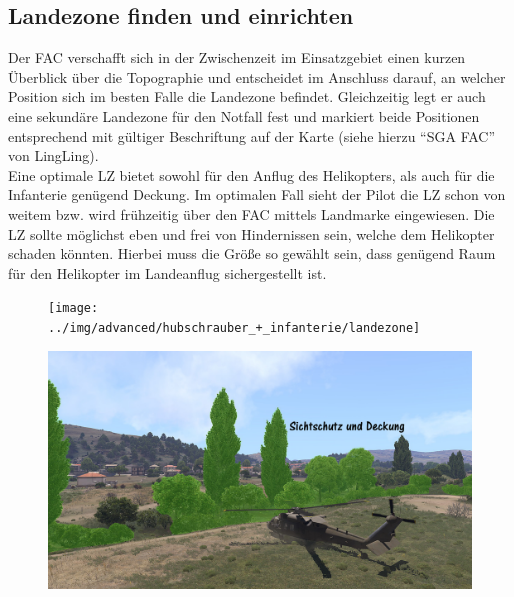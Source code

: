 \subsection{Landezone finden und einrichten}
Der FAC verschafft sich in der Zwischenzeit im Einsatzgebiet einen kurzen Überblick über 
die Topographie und entscheidet im Anschluss darauf, an welcher Position sich im besten 
Falle die Landezone befindet. Gleichzeitig legt er auch eine sekundäre Landezone für den 
Notfall fest und markiert beide Positionen entsprechend mit gültiger Beschriftung auf der  
Karte (siehe hierzu “SGA FAC” von LingLing).\\
Eine optimale LZ bietet sowohl für den Anflug des Helikopters, als auch für die Infanterie 
genügend Deckung. Im optimalen Fall sieht der Pilot die LZ schon von weitem bzw. wird  
frühzeitig über den FAC mittels Landmarke eingewiesen. Die LZ sollte möglichst eben und  
frei von Hindernissen sein, welche dem Helikopter schaden könnten. Hierbei muss die  
Größe so gewählt sein, dass genügend Raum für den Helikopter im Landeanflug  
sichergestellt ist. 
	\begin{figure}[htbp]
		\centering
		\texttt{[image: ../img/advanced/hubschrauber\_+\_infanterie/landezone]}
	\end{figure}
	\begin{figure}[htbp]
		\centering
		\includegraphics[width=0.95\linewidth]{../img/advanced/hubschrauber_+_infanterie/verdeckte-landung}
	\end{figure}	

